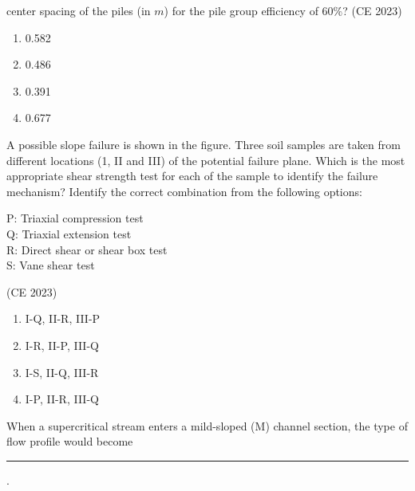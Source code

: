 center spacing of the piles (in $m$) for the pile group efficiency of $60\%$?
\hfill{(CE 2023)}
\begin{enumerate}
\item 0.582
\item 0.486
\item 0.391
\item 0.677
\end{enumerate}
\item A possible slope failure is shown in the figure. Three soil samples are taken from different locations (1, II and III) of the potential failure plane. Which is the most appropriate shear strength test for each of the sample to identify the failure mechanism? Identify the correct combination from the following options:

\text{  } \qquad P: Triaxial compression test\\
\text{  } \qquad Q: Triaxial extension test\\
\text{  } \qquad R: Direct shear or shear box test\\
\text{  } \qquad S: Vane shear test
\begin{center}
{
}
\end{center}
\hfill{(CE 2023)}
\begin{enumerate}
\item I-Q, II-R, III-P
\item I-R, II-P, III-Q
\item I-S, II-Q, III-R
\item I-P, II-R, III-Q
\end{enumerate}
\item When a supercritical stream enters a mild-sloped (M) channel section, the type of
flow profile would become \rule{2cm}{0.4pt}.

